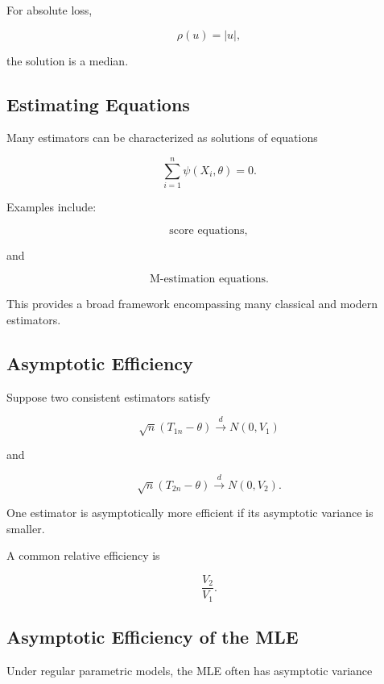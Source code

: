 For absolute loss,

\[
\rho(u)=|u|,
\]

the solution is a median.

\subsection{Estimating Equations}
\label{subsec:estimating-equations}

Many estimators can be characterized as solutions of equations

\[
\boxed{
\sum_{i=1}^{n}
\psi(X_i,\theta)
=
0.
}
\]

Examples include:

\[
\boxed{
\text{score equations},
}
\]

and

\[
\boxed{
\text{M-estimation equations}.
}
\]

This provides a broad framework encompassing many classical and modern
estimators.

\subsection{Asymptotic Efficiency}
\label{subsec:asymptotic-efficiency}

Suppose two consistent estimators satisfy

\[
\sqrt{n}
(
T_{1n}-\theta
)
\xrightarrow{d}
N(0,V_1)
\]

and

\[
\sqrt{n}
(
T_{2n}-\theta
)
\xrightarrow{d}
N(0,V_2).
\]

One estimator is asymptotically more efficient if its asymptotic
variance is smaller.

A common relative efficiency is

\[
\boxed{
\frac{V_2}{V_1}.
}
\]

\subsection{Asymptotic Efficiency of the MLE}
\label{subsec:mle-asymptotic-efficiency}

Under regular parametric models, the MLE often has asymptotic variance

